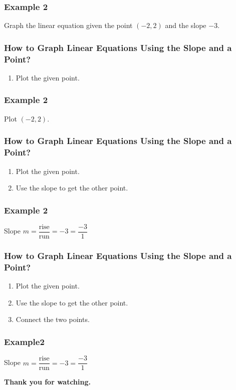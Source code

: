 \documentclass[14pt]{beamer}
\begin{document}
    \begin{frame}
    	\frametitle{Example 2}
    	Graph the linear equation given the point $ (-2, 2) $ and the slope $ -3 $.
    \end{frame} 
    
    \begin{frame}
    	\frametitle{How to Graph Linear Equations Using the Slope and a Point?}
    	\begin{enumerate}  
    		\item Plot the given point.
    	\end{enumerate} 
    \end{frame} 
    
    \begin{frame}
    	\frametitle{Example 2}
    	Plot $ (-2, 2) $.
    \end{frame}
    
    \begin{frame}
    	\frametitle{How to Graph Linear Equations Using the Slope and a Point?}
    	\begin{enumerate}  
    		\item Plot the given point.
    		\item Use the slope to get the other point.
    	\end{enumerate} 
    \end{frame} 
    
    \begin{frame}
    	\frametitle{Example 2}
    	Slope $m = \dfrac{\text{rise}}{\text{run}} = -3 = \dfrac{-3}{1} $
    \end{frame}
    
    \begin{frame}
    	\frametitle{How to Graph Linear Equations Using the Slope and a Point?}
    	\begin{enumerate}  
    		\item Plot the given point.
    		\item Use the slope to get the other point.
    		\item Connect the two points.
    	\end{enumerate} 
    \end{frame} 
    
    \begin{frame}
    	\frametitle{Example2}
    	Slope $m = \dfrac{\text{rise}}{\text{run}} = -3 = \dfrac{-3}{1} $
    \end{frame} 
 
    \begin{frame}
    	\begin{center}
    		\textbf{\LARGE Thank you for watching.}
    	\end{center}
    \end{frame}
	
\end{document}
